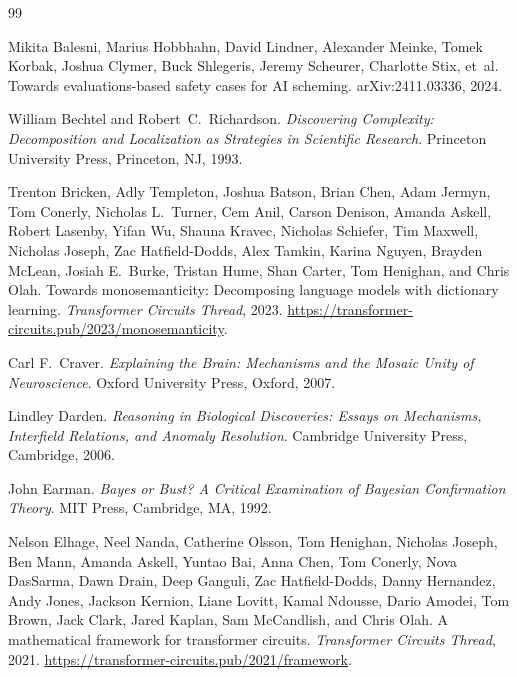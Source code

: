 \documentclass{article}
\begin{document}

\begin{thebibliography}{99}

Mikita Balesni, Marius Hobbhahn, David Lindner, Alexander Meinke, Tomek
  Korbak, Joshua Clymer, Buck Shlegeris, Jeremy Scheurer, Charlotte Stix,
  et~al.
\newblock Towards evaluations-based safety cases for {AI} scheming.
\newblock arXiv:2411.03336, 2024.

William Bechtel and Robert~C.\ Richardson.
\newblock \emph{Discovering Complexity: Decomposition and Localization as
  Strategies in Scientific Research}.
\newblock Princeton University Press, Princeton, NJ, 1993.

Trenton Bricken, Adly Templeton, Joshua Batson, Brian Chen, Adam Jermyn,
  Tom Conerly, Nicholas L.\ Turner, Cem Anil, Carson Denison, Amanda Askell,
  Robert Lasenby, Yifan Wu, Shauna Kravec, Nicholas Schiefer, Tim Maxwell,
  Nicholas Joseph, Zac Hatfield-Dodds, Alex Tamkin, Karina Nguyen, Brayden
  McLean, Josiah E.\ Burke, Tristan Hume, Shan Carter, Tom Henighan, and
  Chris Olah.
\newblock Towards monosemanticity: Decomposing language models with dictionary
  learning.
\newblock \emph{Transformer Circuits Thread}, 2023.
\newblock \url{https://transformer-circuits.pub/2023/monosemanticity}.

Carl F.\ Craver.
\newblock \emph{Explaining the Brain: Mechanisms and the Mosaic Unity of
  Neuroscience}.
\newblock Oxford University Press, Oxford, 2007.

Lindley Darden.
\newblock \emph{Reasoning in Biological Discoveries: Essays on Mechanisms,
  Interfield Relations, and Anomaly Resolution}.
\newblock Cambridge University Press, Cambridge, 2006.

John Earman.
\newblock \emph{Bayes or Bust? A Critical Examination of Bayesian Confirmation
  Theory}.
\newblock MIT Press, Cambridge, MA, 1992.

Nelson Elhage, Neel Nanda, Catherine Olsson, Tom Henighan, Nicholas Joseph,
  Ben Mann, Amanda Askell, Yuntao Bai, Anna Chen, Tom Conerly, Nova DasSarma,
  Dawn Drain, Deep Ganguli, Zac Hatfield-Dodds, Danny Hernandez, Andy Jones,
  Jackson Kernion, Liane Lovitt, Kamal Ndousse, Dario Amodei, Tom Brown, Jack
  Clark, Jared Kaplan, Sam McCandlish, and Chris Olah.
\newblock A mathematical framework for transformer circuits.
\newblock \emph{Transformer Circuits Thread}, 2021.
\newblock \url{https://transformer-circuits.pub/2021/framework}.


\end{thebibliography}
\end{document}
